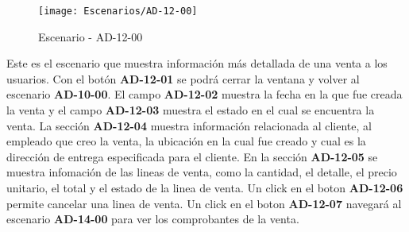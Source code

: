 \begin{figure}[H]
\centering
\texttt{[image: Escenarios/AD-12-00]}
\caption{Escenario - AD-12-00}
\label{fig:AD-12-00}
\end{figure}
Este es el escenario que muestra información más detallada de una venta a los usuarios.
Con el botón \textbf{AD-12-01} se podrá cerrar la ventana y volver al escenario \textbf{AD-10-00}. El campo \textbf{AD-12-02} muestra la fecha en la que fue creada la venta y el campo \textbf{AD-12-03} muestra el estado en el cual se encuentra la venta.
La sección \textbf{AD-12-04} muestra información relacionada al cliente, al empleado que creo la venta, la ubicación en la cual fue creado y cual es la dirección de entrega especificada para el cliente.
En la sección \textbf{AD-12-05} se muestra infomación de las lineas de venta, como la cantidad, el detalle, el precio unitario, el total y el estado de la linea de venta. Un click en el boton \textbf{AD-12-06} permite cancelar una linea de venta. Un click en el boton \textbf{AD-12-07} navegará al escenario \textbf{AD-14-00} para ver los comprobantes de la venta. 
\clearpage
